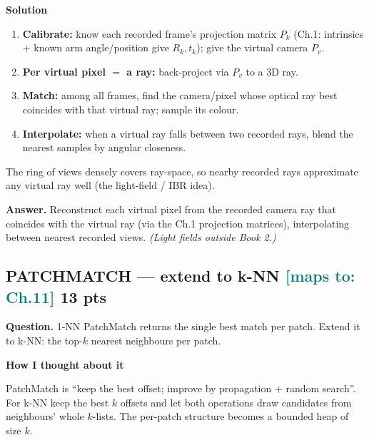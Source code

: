\documentclass[11pt]{article}
\newcommand{\step}[1]{\smallskip\par\noindent\textbf{\textcolor{amber}{#1}}\par\nobreak}
\newcommand{\maps}[1]{{\small\textcolor{teal}{[maps to: #1]}}}
\newcommand{\ans}[1]{\begin{answer}\textbf{Answer.} #1\end{answer}}
\begin{document}
\step{Solution}
\begin{enumerate}
  \item \textbf{Calibrate:} know each recorded frame's projection matrix $P_k$ (Ch.1: intrinsics + known arm
  angle/position give $R_k,t_k$); give the virtual camera $P_v$.
  \item \textbf{Per virtual pixel $=$ a ray:} back-project via $P_v$ to a 3D ray.
  \item \textbf{Match:} among all frames, find the camera/pixel whose optical ray best coincides with that virtual
  ray; sample its colour.
  \item \textbf{Interpolate:} when a virtual ray falls between two recorded rays, blend the nearest samples by
  angular closeness.
\end{enumerate}
The ring of views densely covers ray-space, so nearby recorded rays approximate any virtual ray well (the
light-field / IBR idea).
\ans{Reconstruct each virtual pixel from the recorded camera ray that coincides with the virtual ray (via the Ch.1
projection matrices), interpolating between nearest recorded views. \emph{(Light fields outside Book 2.)}}

\subsection{PATCHMATCH --- extend to k-NN \hfill \maps{Ch.11} \hfill \textnormal{\small 13 pts}}
\begin{qbox}\textbf{Question.} 1-NN PatchMatch returns the single best match per patch. Extend it to k-NN: the
top-$k$ nearest neighbours per patch.\end{qbox}

\step{How I thought about it}
PatchMatch is ``keep the best offset; improve by propagation + random search''. For k-NN keep the best $k$ offsets
and let both operations draw candidates from neighbours' whole $k$-lists. The per-patch structure becomes a
bounded heap of size $k$.
\end{document}
